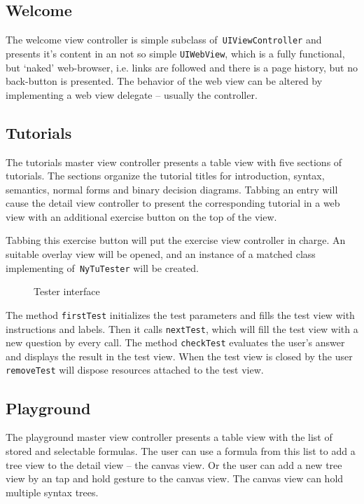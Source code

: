 \subsection{Welcome}

The welcome view controller is simple subclass of\verb+ UIViewController+ and presents it's content in an not so simple \verb+UIWebView+,
which is a fully functional, but ‘naked’ web-browser, i.e. links are followed and there is a page history, but no back-button is presented.
The behavior of the web view can be altered by implementing a web view delegate – usually the controller.

\subsection{Tutorials}

The tutorials master view controller presents a table view with five sections of tutorials.
The sections organize the tutorial titles for 
introduction, syntax, semantics, normal forms and binary decision diagrams.
Tabbing an entry will cause the detail view controller to present the corresponding tutorial in a web view
with an additional exercise button on the top of the view.

Tabbing this exercise button will put the exercise view controller in charge. 
An suitable overlay view will be opened, 
and an instance of a matched class implementing of\verb+ NyTuTester+ will be created.

\begin{figure}[htbp]
\begin{center}
\caption{Tester interface}
\label{fig:Tester}
\end{center}
\end{figure}

The method \verb+firstTest+ initializes the test parameters and fills the test view with instructions and labels. 
Then it calls \verb+nextTest+, which will fill the test view with a new question by every call.
The method \verb+checkTest+ evaluates the user's answer and displays the result in the test view.
When the test view is closed by the user \verb+removeTest+ will dispose resources attached to the test view.

\subsection{Playground}

The playground master view controller presents a table view with the list of stored and selectable formulas.
The user can use a formula from this list to add a tree view to the detail view – the canvas view.
Or the user can add a new tree view by an tap and hold gesture to the canvas view.
The canvas view can hold multiple syntax trees.

